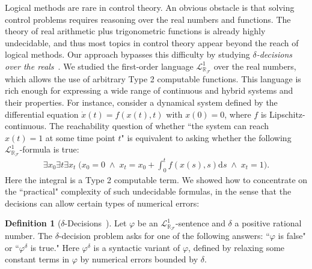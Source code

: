 \documentclass[10pt]{article}
\newcommand{\lrf}{\mathcal{L}_{\mathbb{R}_{\mathcal{F}}}}
\theoremstyle{definition}
\newtheorem{definition}{Definition}
\begin{document}

Logical methods are rare in control theory. An obvious obstacle is that solving control problems requires reasoning over the real numbers and functions. The theory of real arithmetic plus trigonometric functions is already highly undecidable, and thus most topics in control theory appear beyond the reach of logical methods. Our approach bypasses this difficulty by studying {\em $\delta$-decisions over the reals}~\cite{DBLP:conf/lics/GaoAC12}. We studied the first-order language $\lrf^1$ over the real numbers, which allows the use of arbitrary Type 2 computable functions. This language is rich enough for expressing a wide range of continuous and hybrid systems and their properties. For instance, consider a dynamical system defined by the differential equation $\dot{x}(t) = f(x(t),t)$ with $x(0)= 0$, where $f$ is Lipschitz-continuous. The reachability question of whether ``the system can reach $x(t)=1$ at some time point $t$" is equivalent to asking whether the following $\mathcal{L}^1_{\mathbb{R}_{\mathcal{F}}}$-formula is true:
\begin{eqnarray*}\exists x_0 \exists t \exists x_t\; \bigg(x_0 = 0 \;\wedge\; x_t = x_0 + \int_{0}^t f(x(s),s)\mathrm{d}s\; \wedge\; x_t = 1\bigg).\end{eqnarray*}
Here the integral is a Type 2 computable term. We showed how to concentrate on the ``practical" complexity of such undecidable formulas, in the sense that the decisions can allow certain types of numerical errors:
\begin{definition}[$\delta$-Decisions~\cite{DBLP:conf/lics/GaoAC12}] Let $\varphi$ be an $\lrf^1$-sentence and $\delta$ a positive rational number. The $\delta$-decision problem asks for one of the following answers: ``$\varphi$ is false" or ``$\varphi^{\delta}$ is true." Here $\varphi^{\delta}$ is a syntactic variant of $\varphi$, defined by relaxing some constant terms in $\varphi$ by numerical errors bounded by $\delta$. 
\end{definition}
\end{document}

